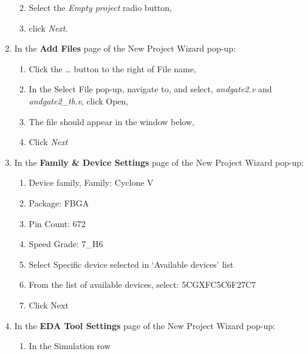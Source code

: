 \begin{enumerate}
        \begin{enumerate}
                \def\labelenumii{\alph{enumii}.}
            \item
                Select the \emph{Empty project} radio button,
            \item
                click \emph{Next}.
        \end{enumerate}
    \item
        In the \textbf{Add Files} page of the New Project Wizard pop-up:

        \begin{enumerate}
                \def\labelenumii{\alph{enumii}.}
            \item
                Click the \ldots{} button to the right of File name,
            \item
                In the Select File pop-up, navigate to, and select,
                \emph{andgate2.v} and \emph{andgate2\_tb.v}, click Open,
            \item
                The file should appear in the window below,
            \item
                Click \emph{Next}
        \end{enumerate}
    \item
        In the \textbf{Family \& Device Settings} page of the New Project
        Wizard pop-up:

        \begin{enumerate}
                \def\labelenumii{\alph{enumii}.}
            \item
                Device family, Family: Cyclone V
            \item
                Package: FBGA
            \item
                Pin Count: 672
            \item
                Speed Grade: 7\_H6
            \item
                Select Specific device selected in `Available devices' list
            \item
                From the list of available devices, select: 5CGXFC5C6F27C7
            \item
                Click Next
        \end{enumerate}
    \item
        In the \textbf{EDA Tool Settings} page of the New Project Wizard
        pop-up:

        \begin{enumerate}
                \def\labelenumii{\alph{enumii}.}
            \item
                In the Simulation row


\end{enumerate}
\end{enumerate}

